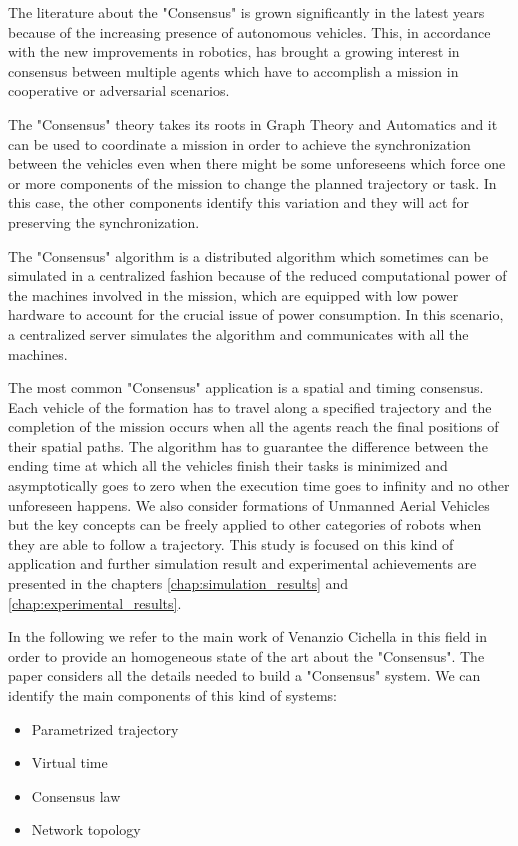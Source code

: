 The literature about the "Consensus" is grown significantly in the latest years
because of the increasing presence of autonomous vehicles. This, in accordance with
the new improvements in robotics, has brought a growing interest in consensus
between multiple agents which have to accomplish a mission in cooperative or adversarial
scenarios.

The "Consensus" theory takes its roots in Graph Theory and Automatics and it can
be used to coordinate a mission in order to achieve the synchronization between
the vehicles even when there might be some unforeseens which force one or more
components of the mission to change the planned trajectory or task. In this case,
the other components identify this variation and they will act for preserving the
synchronization.

The "Consensus" algorithm is a distributed algorithm which sometimes can be simulated
in a centralized fashion because of the reduced computational power of the machines
involved in the mission, which are equipped with low power hardware to account for
the crucial issue of power consumption.
In this scenario, a centralized server simulates the algorithm and communicates with
all the machines.

The most common "Consensus" application is a spatial and timing consensus.
Each vehicle of the formation has to travel along a specified trajectory and the
completion of the mission occurs when all the agents reach the final positions of their
spatial paths. The algorithm has to guarantee the difference between
the ending time at which all the vehicles finish their tasks is minimized and
asymptotically goes to zero when the execution time goes to infinity and no other
unforeseen happens.
We also consider formations of Unmanned Aerial Vehicles but the key concepts can
be freely applied to other categories of robots when they are able to follow a trajectory.
This study is focused on this kind of application and further
simulation result and experimental achievements are presented in the chapters
\ref{chap:simulation_results} and \ref{chap:experimental_results}.

In the following we refer to the main work of Venanzio Cichella in this field \cite{cichellaMain}
in order to provide an homogeneous state of the art about the "Consensus".
The paper considers all the details needed to build a "Consensus" system.
We can identify the main components of this kind of systems:
\begin{itemize}
  \item Parametrized trajectory
  \item Virtual time
  \item Consensus law
  \item Network topology
\end{itemize}










